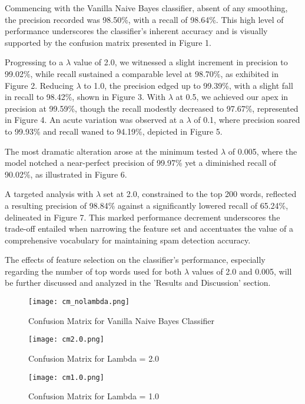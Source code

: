 \documentclass{acm_proc_article-sp}
\begin{document}
Commencing with the Vanilla Naive Bayes classifier, absent of any smoothing, the precision recorded was 98.50\%, with a recall of 98.64\%. This high level of performance underscores the classifier's inherent accuracy and is visually supported by the confusion matrix presented in Figure 1.

Progressing to a \(\lambda\) value of 2.0, we witnessed a slight increment in precision to 99.02\%, while recall sustained a comparable level at 98.70\%, as exhibited in Figure 2. Reducing \(\lambda\) to 1.0, the precision edged up to 99.39\%, with a slight fall in recall to 98.42\%, shown in Figure 3. With \(\lambda\) at 0.5, we achieved our apex in precision at 99.59\%, though the recall modestly decreased to 97.67\%, represented in Figure 4. An acute variation was observed at a \(\lambda\) of 0.1, where precision soared to 99.93\% and recall waned to 94.19\%, depicted in Figure 5.

The most dramatic alteration arose at the minimum tested \(\lambda\) of 0.005, where the model notched a near-perfect precision of 99.97\% yet a diminished recall of 90.02\%, as illustrated in Figure 6.

A targeted analysis with \(\lambda\) set at 2.0, constrained to the top 200 words, reflected a resulting precision of 98.84\% against a significantly lowered recall of 65.24\%, delineated in Figure 7. This marked performance decrement underscores the trade-off entailed when narrowing the feature set and accentuates the value of a comprehensive vocabulary for maintaining spam detection accuracy.

The effects of feature selection on the classifier's performance, especially regarding the number of top words used for both \(\lambda\) values of 2.0 and 0.005, will be further discussed and analyzed in the 'Results and Discussion' section.

\begin{figure}[!htb]
    \centering
    \texttt{[image: cm\_nolambda.png]}
    \caption{Confusion Matrix for Vanilla Naive Bayes Classifier}
    \label{fig:vanilla_cm}
\end{figure}

\begin{figure}[!htb]
    \centering
    \texttt{[image: cm2.0.png]}
    \caption{Confusion Matrix for Lambda = 2.0}
    \label{fig:lambda2_cm}
\end{figure}

\begin{figure}[!htb]
    \centering
    \texttt{[image: cm1.0.png]}
    \caption{Confusion Matrix for Lambda = 1.0}
    \label{fig:lambda1_cm}
\end{figure}
\end{document}

